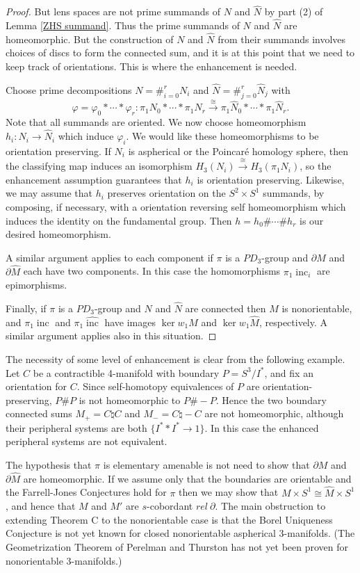\documentclass[12pt]{amsart}
\theoremstyle{definition}
\DeclareMathOperator{\inc}{inc}
\newcommand{\wh}[1]{{\widehat{#1}}}
\begin{document}
\begin{proof}
  But lens spaces are not prime summands of $N$ and $\wh N$ by part (2) of Lemma \ref{ZHS summand}.   Thus the prime summands of $N$ and $\wh N$ are homeomorphic. But the construction of  $N$ and $\wh{N}$ from their summands involves 
choices of discs to form the connected sum, 
and it is at this point that we need to keep track of orientations.   This is where the enhancement is needed.  

Choose prime decompositions   $N=\#_{i=0}^rN_i$ and $\wh{N}=\#_{j=0}^r\wh{N}_j$  with  $$\varphi =  \varphi_0 * \cdots *  \varphi_r  : \pi_1N_0  * \cdots *  \pi_1N_r \xrightarrow{\cong}  \pi_1\wh N_0  * \cdots *  \pi_1 \wh N_r.$$
Note that all summands are oriented.   We now choose homeomorphism $h_i : N_i \to \wh N_i$ which induce $\varphi_i$.   We would like these homeomorphisms to be orientation preserving.   If $N_i$ is aspherical or the Poincar\'e homology sphere, then the classifying map  induces an isomorphism $H_3(N_i) \xrightarrow{\cong} H_3(\pi_1N_i)$, so the enhancement assumption guarantees that $h_i$ is orientation preserving.   Likewise, we may assume that $h_i$ preserves orientation on the $S^2 \times S^1$ summands, by composing, if necessary, with a orientation reversing self homeomorphism which induces the identity on the fundamental group.   Then $h = h_0 \# \cdots \# h_r$ is our desired homeomorphism.  


A similar argument applies to each component if $\pi$ is a $PD_3$-group 
and $\partial{M}$ and $\partial\widehat{M}$ each have two components.
In this case the homomorphisms $\pi_1\inc_i$ are epimorphisms.


Finally, if $\pi$ is a $PD_3$-group and $N$ and $\wh{N}$ are connected
then $M$ is nonorientable, and $\pi_1\!\inc$ and $\pi_1\wh\inc$  have images
$\ker w_1M$ and $\ker w_1\wh{M}$, respectively.
A similar argument applies also in this situation.
\end{proof}

The necessity of some level of enhancement is clear from the following example.
Let $C$ be a contractible 4-manifold with boundary
$P=S^3/I^*$, and fix an orientation for $C$.
Since self-homotopy equivalences of $P$ are orientation-preserving,
$P\#{P}$ is not homeomorphic to $P\#-\!P$.
Hence the two boundary connected sums $M_+=C\natural{C}$ and 
$M_-=C\natural-\!C$ are not homeomorphic, 
although their peripheral systems are both $\{I^**I^*\to1\}$.
In this case the enhanced peripheral systems are not equivalent.

The hypothesis that $\pi$ is elementary amenable is not need to show that
$\partial{M}$ and $\partial{\wh{M}}$ are homeomorphic.
If we assume only that the boundaries are orientable and the Farrell-Jones Conjectures hold for 
$\pi$ then we may show that $M\times{S^1}\cong\wh{M}\times{S^1}$,
and hence that $M$ and $M'$ are $s$-cobordant $rel~\partial$.
The main obstruction to extending Theorem C to the nonorientable case is that 
the Borel Uniqueness Conjecture is not yet known for closed nonorientable aspherical 3-manifolds.
(The Geometrization Theorem of Perelman and Thurston has not yet been proven for 
nonorientable  3-manifolds.)
\end{document}
